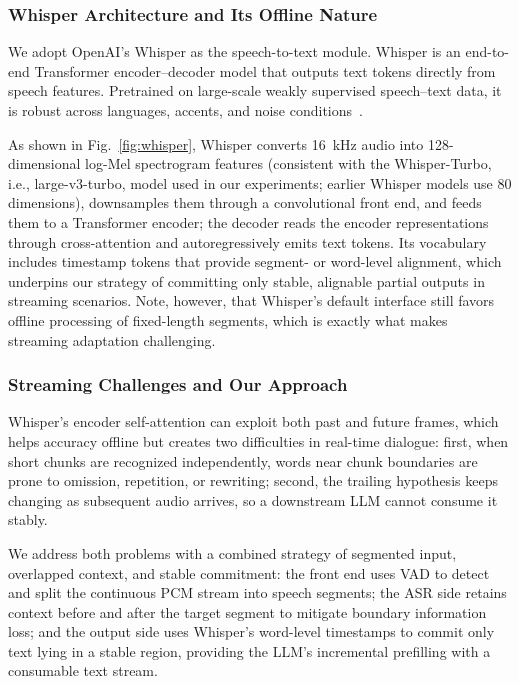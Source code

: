 \documentclass[conference]{IEEEtran}
\begin{document}
\subsubsection{Whisper Architecture and Its Offline Nature}

We adopt OpenAI's Whisper as the speech-to-text module. Whisper is an end-to-end Transformer encoder--decoder model that outputs text tokens directly from speech features. Pretrained on large-scale weakly supervised speech--text data, it is robust across languages, accents, and noise conditions~\cite{ref12}.

As shown in Fig.~\ref{fig:whisper}, Whisper converts 16~kHz audio into 128-dimensional log-Mel spectrogram features (consistent with the Whisper-Turbo, i.e., large-v3-turbo, model used in our experiments; earlier Whisper models use 80 dimensions), downsamples them through a convolutional front end, and feeds them to a Transformer encoder; the decoder reads the encoder representations through cross-attention and autoregressively emits text tokens. Its vocabulary includes timestamp tokens that provide segment- or word-level alignment, which underpins our strategy of committing only stable, alignable partial outputs in streaming scenarios. Note, however, that Whisper's default interface still favors offline processing of fixed-length segments, which is exactly what makes streaming adaptation challenging.

\subsubsection{Streaming Challenges and Our Approach}

Whisper's encoder self-attention can exploit both past and future frames, which helps accuracy offline but creates two difficulties in real-time dialogue: first, when short chunks are recognized independently, words near chunk boundaries are prone to omission, repetition, or rewriting; second, the trailing hypothesis keeps changing as subsequent audio arrives, so a downstream LLM cannot consume it stably.

We address both problems with a combined strategy of segmented input, overlapped context, and stable commitment: the front end uses VAD to detect and split the continuous PCM stream into speech segments; the ASR side retains context before and after the target segment to mitigate boundary information loss; and the output side uses Whisper's word-level timestamps to commit only text lying in a stable region, providing the LLM's incremental prefilling with a consumable text stream.
\end{document}
